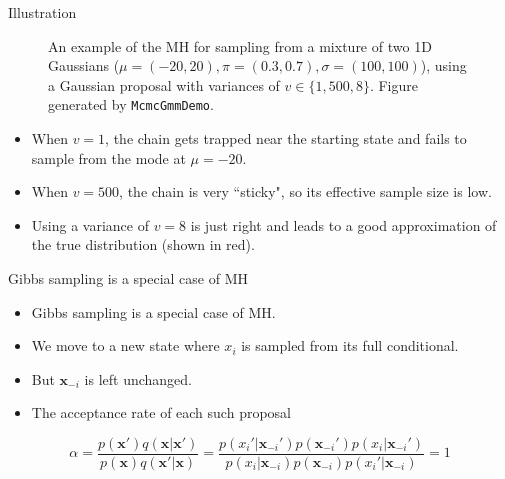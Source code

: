 \documentclass[10pt,mathserif]{beamer}
\begin{document}
\begin{frame}{Illustration}
\begin{figure}[h]
    \centering     %
    \caption{An example of the MH for sampling from a mixture of two 1D Gaussians ($\mu = (-20, 20), \pi = (0.3, 0.7), \sigma = (100, 100)$), using a Gaussian proposal with variances of $v \in \{1, 500, 8\}$. Figure generated by \texttt{McmcGmmDemo}.}
\end{figure}

\begin{itemize}
    \item When $v = 1$, the chain gets trapped near the starting state and fails to sample from the mode at $\mu = -20$.
    \item When $v = 500$, the chain is very ``sticky", so its effective sample size is low.
    \item Using a variance of $v = 8$ is just right and leads to a good approximation of the true distribution (shown in red).
\end{itemize}
\end{frame}


\begin{frame}{Gibbs sampling is a special case of MH}
\begin{itemize}
    \item Gibbs sampling is a special case of MH.
    \item We move to a new state where $x_i$ is sampled from its full conditional.
    \item But $\bm{x}_{-i}$ is left unchanged.
    \item The acceptance rate of each such proposal
\end{itemize}

\begin{equation*} 
    \alpha = \frac{p(\bm{x}')q(\bm{x}|\bm{x}')}{p(\bm{x})q(\bm{x}'|\bm{x})} = \frac{p(x_i'|\bm{x}_{-i}')p(\bm{x}_{-i}')p(x_i|\bm{x}_{-i}')}{p(x_i|\bm{x}_{-i})p(\bm{x}_{-i})p(x_i'|\bm{x}_{-i})} = 1
\end{equation*} 
\end{frame}
\end{document}
